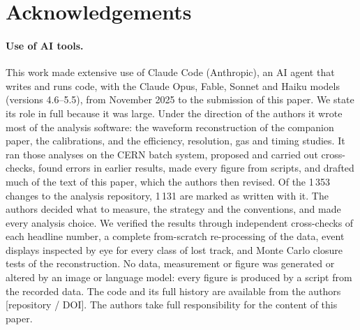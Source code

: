 \documentclass[11pt,a4paper]{article}
\begin{document}
\appendix









\section*{Acknowledgements}

\paragraph{Use of AI tools.}
This work made extensive use of Claude Code (Anthropic), an AI agent that writes and runs code, with the Claude
Opus, Fable, Sonnet and Haiku models (versions 4.6--5.5), from November 2025 to the submission of this paper. We state
its role in full because it was large. Under the direction of the authors it wrote most of the analysis software:
the waveform reconstruction of the companion paper, the calibrations, and the efficiency, resolution, gas and timing
studies. It ran those analyses on the CERN batch system, proposed and carried out cross-checks, found errors in
earlier results, made every figure from scripts, and drafted much of the text of this paper, which the authors then
revised. Of the 1\,353 changes to the analysis repository, 1\,131 are marked as written with it.
The authors decided what to measure, the strategy and the conventions, and made every analysis choice. We verified
the results through independent cross-checks of each headline number, a complete from-scratch re-processing of the
data, event displays inspected by eye for every class of lost track, and Monte Carlo closure tests of the
reconstruction. No data, measurement or figure was generated or altered by an image or language model: every figure is
produced by a script from the recorded data. The code and its full history are available from the authors
[repository / DOI]. The authors take full responsibility for the content of this paper.



\end{document}
